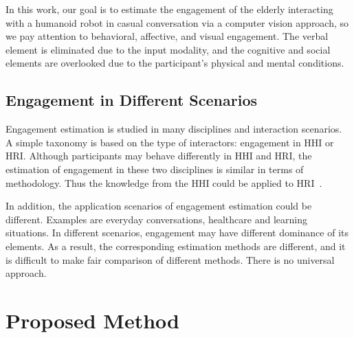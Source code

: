 \documentclass[VANCOUVER,STIX1COL]{WileyNJD-v2}
\begin{document}
In this work, our goal is to estimate the engagement of the elderly interacting with a humanoid robot in casual conversation via a computer vision approach, so we pay attention to behavioral, affective, and visual engagement. The verbal element is eliminated due to the input modality, and the cognitive and social elements are overlooked due to the participant's physical and mental conditions.


\subsection{Engagement in Different Scenarios}
Engagement estimation is studied in many disciplines and interaction scenarios. A simple taxonomy is based on the type of interactors: engagement in HHI or HRI. Although participants may behave differently in HHI and HRI, the estimation of engagement in these two disciplines is similar in terms of methodology. Thus the knowledge from the HHI could be applied to HRI~\cite{Oertel2021EngagementAware}.

In addition, the application scenarios of engagement estimation could be different. Examples are everyday conversations, healthcare and learning situations. In different scenarios, engagement may have different dominance of its elements. As a result, the corresponding estimation methods are different, and it is difficult to make fair comparison of different methods. There is no universal approach.


\section{Proposed Method}
\label{s:Engagement_Estimation_of_the_Elderly}

\end{document}
